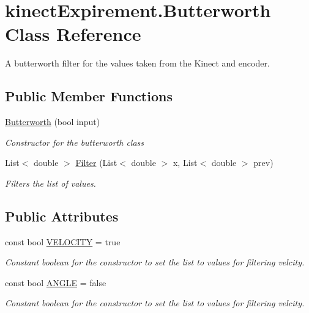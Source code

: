 \hypertarget{classkinect_expirement_1_1_butterworth}{}\section{kinect\+Expirement.\+Butterworth Class Reference}
\label{classkinect_expirement_1_1_butterworth}


A butterworth filter for the values taken from the Kinect and encoder.  


\subsection*{Public Member Functions}
\begin{DoxyCompactItemize}
\item 
\hyperlink{classkinect_expirement_1_1_butterworth_a37322f18a1f8f59271df8aac36e79f26}{Butterworth} (bool input)
\begin{DoxyCompactList}\small\item\em Constructor for the butterworth class \end{DoxyCompactList}\item 
List$<$ double $>$ \hyperlink{classkinect_expirement_1_1_butterworth_a0e51ad9aa7218b63b901cfd4e71ea75b}{Filter} (List$<$ double $>$ x, List$<$ double $>$ prev)
\begin{DoxyCompactList}\small\item\em Filters the list of values. \end{DoxyCompactList}\end{DoxyCompactItemize}
\subsection*{Public Attributes}
\begin{DoxyCompactItemize}
\item 
const bool \hyperlink{classkinect_expirement_1_1_butterworth_afc717929ffc8d554b7e0263e2b06806a}{V\+E\+L\+O\+C\+I\+TY} = true
\begin{DoxyCompactList}\small\item\em Constant boolean for the constructor to set the list to values for filtering velcity. \end{DoxyCompactList}\item 
const bool \hyperlink{classkinect_expirement_1_1_butterworth_ac991123445c654cb0da7d7841e313b2c}{A\+N\+G\+LE} = false
\begin{DoxyCompactList}\small\item\em Constant boolean for the constructor to set the list to values for filtering velcity. \end{DoxyCompactList}\end{DoxyCompactItemize}


